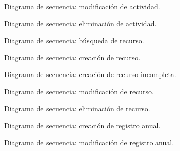 \begin{figure}
\centering
{}
\caption{Diagrama de secuencia: modificación de actividad.}
\label{fig:actualizar_actividad}
\end{figure}

\begin{figure}
\centering
{}
\caption{Diagrama de secuencia: eliminación de actividad.}
\label{fig:eliminacion_actividad}
\end{figure}

\begin{figure}
\centering
{}
\caption{Diagrama de secuencia: búsqueda de recurso.}
\label{fig:buscar_recurso}
\end{figure}

\begin{figure}
\centering
{}
\caption{Diagrama de secuencia: creación de recurso.}
\label{fig:crear_recurso}
\end{figure}

\begin{figure}
\centering
{}
\caption{Diagrama de secuencia: creación de recurso incompleta.}
\label{fig:crear_recurso_campos}
\end{figure}

\begin{figure}
\centering
{}
\caption{Diagrama de secuencia: modificación de recurso.}
\label{fig:actualizar_recurso}
\end{figure}

\begin{figure}
\centering
{}
\caption{Diagrama de secuencia: eliminación de recurso.}
\label{fig:eliminacion_recurso}
\end{figure}

\begin{figure}
\centering
{}
\caption{Diagrama de secuencia: creación de registro anual.}
\label{fig:crear_registro_anual}
\end{figure}

\begin{figure}
\centering
{}
\caption{Diagrama de secuencia: modificación de registro anual.}
\label{fig:modificar_registro_anual}
\end{figure}

